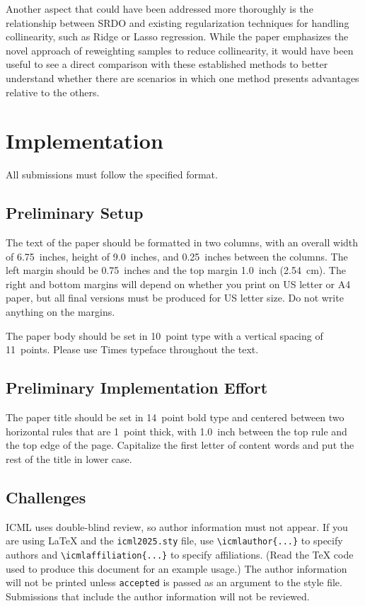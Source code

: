 \documentclass{article}
\theoremstyle{plain}
\theoremstyle{definition}
\theoremstyle{remark}
\begin{document}
Another aspect that could have been addressed more thoroughly is the relationship between SRDO and existing regularization techniques for handling collinearity, such as Ridge or Lasso regression. While the paper emphasizes the novel approach of reweighting samples to reduce collinearity, it would have been useful to see a direct comparison with these established methods to better understand whether there are scenarios in which one method presents advantages relative to the others.


\section{Implementation}

All submissions must follow the specified format.


\subsection{Preliminary Setup}

The text of the paper should be formatted in two columns, with an
overall width of 6.75~inches, height of 9.0~inches, and 0.25~inches
between the columns. The left margin should be 0.75~inches and the top
margin 1.0~inch (2.54~cm). The right and bottom margins will depend on
whether you print on US letter or A4 paper, but all final versions
must be produced for US letter size.
Do not write anything on the margins.

The paper body should be set in 10~point type with a vertical spacing
of 11~points. Please use Times typeface throughout the text.

\subsection{Preliminary Implementation Effort}

The paper title should be set in 14~point bold type and centered
between two horizontal rules that are 1~point thick, with 1.0~inch
between the top rule and the top edge of the page. Capitalize the
first letter of content words and put the rest of the title in lower
case.

\subsection{Challenges}

ICML uses double-blind review, so author information must not appear. If
you are using \LaTeX\/ and the \texttt{icml2025.sty} file, use
\verb+\icmlauthor{...}+ to specify authors and \verb+\icmlaffiliation{...}+ to specify affiliations. (Read the TeX code used to produce this document for an example usage.) The author information
will not be printed unless \texttt{accepted} is passed as an argument to the
style file.
Submissions that include the author information will not
be reviewed.
\end{document}
